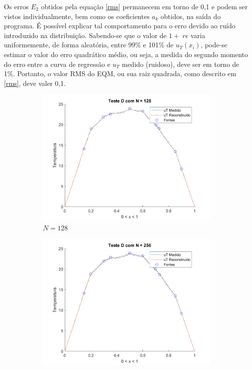\documentclass[12pt]{article}
\begin{document}
\begin{spacing}{1.5}
Os erros $E_2$ obtidos pela equação \eqref{rms} permanecem em torno de 0,1 e podem ser vistos individualmente, bem como os coeficientes $a_k$ obtidos, na saída do programa. É possível explicar tal comportamento para o erro devido ao ruído introduzido na distribuição. Sabendo-se que o valor de $1 +\;r \epsilon$ varia uniformemente, de forma aleatória, entre 99\% e 101\% de $u_T(x_i)$, pode-se estimar o valor do erro quadrático médio, ou seja, a medida do segundo momento\supercite{moment} do erro entre a curva de regressão e $u_T$ medido (ruidoso), deve ser em torno de 1\%. Portanto, o valor RMS do EQM, ou sua raiz quadrada, como descrito em \eqref{rms}, deve valer 0,1.

\begin{figure}[H]
\centering
\caption{Distribuição de temperatura do teste D}
\captionsetup[subfigure]{justification=centering}
    \begin{subfigure}[t]{.485\linewidth}
        \centering
        \includegraphics[width=1\linewidth]{Imagens/FigD128.png}
        \caption{$N=128$}
        \label{fig:testeD_128}
    \end{subfigure}
    \begin{subfigure}[t]{.485\linewidth}
        \centering
        \includegraphics[width=1\linewidth]{Imagens/FigD256.png}

\end{subfigure}
\end{figure}
\end{spacing}
\end{document}

